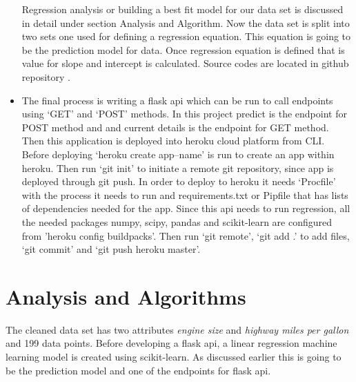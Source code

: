 \begin{itemize}
    Regression analysis or building a best fit model for our data set is
   discussed in detail under section Analysis and Algorithm. Now the data
   set is split into two sets one used for defining a regression 
   equation. This equation is going to be the prediction model for data.
   Once regression equation is defined
   that is value for slope and intercept is calculated.   
   Source codes are located in github repository \cite{regression}.
    \item The final process is writing a flask api which can be run to call 
 endpoints using `GET' and `POST' methods. In this project predict is the
 endpoint for POST method and and current details is the endpoint for GET
 method. Then this application is deployed into heroku cloud platform from
 CLI. Before deploying `heroku create app--name' is run to create an app within
 heroku. Then run `git init' to initiate a remote git repository, since app is 
 deployed through git push. In order to deploy to heroku it needs `Procfile'
 with the process it needs to run and requirements.txt or Pipfile that has lists 
 of dependencies needed for the app. Since this api needs to run regression, all
 the needed packages numpy, scipy, pandas and scikit-learn are configured from 
 'heroku config buildpacks'. Then run `git remote', `git add .' to add files,  
 `git commit' and `git push heroku master'.
\end{itemize}    

\section{Analysis and Algorithms}
  The cleaned data set has two attributes \textit{engine size} and
  \textit{highway miles per gallon} and 199 data points. Before developing
   a flask api, a linear regression machine learning model is created using
   scikit-learn. As discussed earlier this is going to be the prediction model
   and one of the endpoints for flask api.

